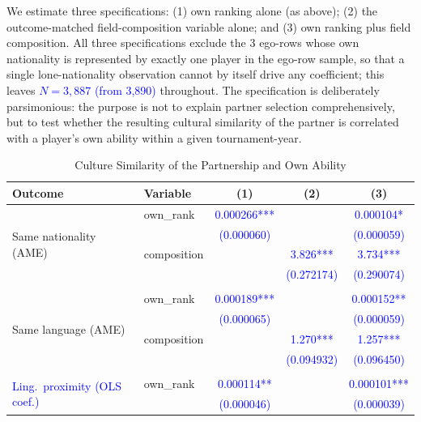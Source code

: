 \documentclass[10pt]{article}
\begin{document}
We estimate three specifications: (1) own ranking alone (as above); (2) the outcome-matched field-composition variable alone; and (3) own ranking plus field composition. All three specifications exclude the 3 ego-rows whose own nationality is represented by exactly one player in the ego-row sample, so that a single lone-nationality observation cannot by itself drive any coefficient; this leaves \textcolor{blue}{$N=3{,}887$ (from 3,890)} throughout. The specification is deliberately parsimonious: the purpose is not to explain partner selection comprehensively, but to test whether the resulting cultural similarity of the partner is correlated with a player's own ability within a given tournament-year.






\begin{table}[htbp]
\color{red}
\centering
\caption{Culture Similarity of the Partnership and Own Ability \label{tab:t9}}
\begin{threeparttable}
\begin{tabular}{llccc}
\toprule
Outcome & Variable & (1) & (2) & (3) \\
\midrule
\multirow{4}{*}{Same nationality (AME)}
 & own\_rank & \textcolor{blue}{0.000266***} & & \textcolor{blue}{0.000104*} \\
 & & \textcolor{blue}{(0.000060)} & & \textcolor{blue}{(0.000059)} \\
 & composition & & \textcolor{blue}{3.826***} & \textcolor{blue}{3.734***} \\
 & & & \textcolor{blue}{(0.272174)} & \textcolor{blue}{(0.290074)} \\
\addlinespace
\midrule\\
\multirow{4}{*}{Same language (AME)}
 & own\_rank & \textcolor{blue}{0.000189***} & & \textcolor{blue}{0.000152**} \\
 & & \textcolor{blue}{(0.000065)} & & \textcolor{blue}{(0.000059)} \\
 & composition & & \textcolor{blue}{1.270***} & \textcolor{blue}{1.257***} \\
 & & & \textcolor{blue}{(0.094932)} & \textcolor{blue}{(0.096450)} \\
\addlinespace
\midrule\\
\multirow{4}{*}{\textcolor{blue}{Ling.\ proximity (OLS coef.)}}
 & own\_rank & \textcolor{blue}{0.000114**} & & \textcolor{blue}{0.000101***} \\
 & & \textcolor{blue}{(0.000046)} & & \textcolor{blue}{(0.000039)} \\

\end{tabular}
\end{threeparttable}
\end{table}
\end{document}
